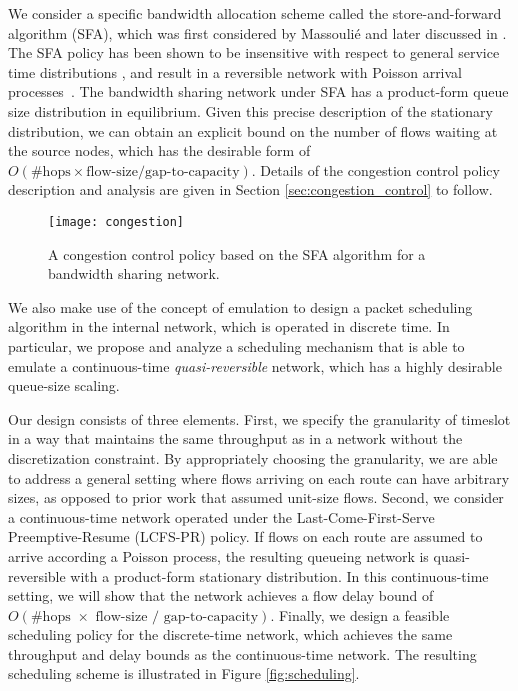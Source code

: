 \documentclass[ssy,preprint]{imsart_axv}
\numberwithin{equation}{section}
\theoremstyle{plain}
\theoremstyle{definition}
\theoremstyle{remark}
\theoremstyle{plain}
\theoremstyle{plain}
\begin{document}
We consider a specific bandwidth allocation scheme called the store-and-forward
algorithm (SFA), which was first considered by Massouli\'{e} and later
discussed in \cite{bonald2003insensitive,kelly2009resource,proutiere_thesis,walton2009fairness}.
The SFA policy has been shown to be insensitive with
respect to general service time distributions \cite{zachary2007insensitivity},
and result in a reversible network with Poisson arrival processes~\cite{walton2009fairness}. The bandwidth sharing
network under SFA has a product-form queue size distribution in equilibrium.
Given this precise description of the stationary distribution, we
can obtain an explicit bound on the number of flows waiting at the
source nodes, which has the desirable form of $\ensuremath{O}(\#\text{hops}\ensuremath{\times}\text{flow-size}\ensuremath{/}\text{gap-to-capacity})$. 
Details of the congestion control policy description and analysis
are given in Section \ref{sec:congestion_control} to follow. 

\begin{figure}
	\begin{centering}
		\texttt{[image: congestion]}
		\par\end{centering}
	\caption{A congestion control policy based on the SFA algorithm for a bandwidth
		sharing network.\label{fig:congestion_control}}
	
\end{figure}



We also make use of the concept of emulation to design a packet scheduling
algorithm in the internal network, which is operated in discrete time.
In particular, we propose and analyze a scheduling mechanism that
is able to emulate a continuous-time \emph{quasi-reversible} network,
which has a highly desirable queue-size scaling. 

Our design consists of three elements. First, we specify the granularity
of timeslot in a way that maintains the same throughput as in a network
without the discretization constraint. By appropriately choosing the granularity,
we are able to address a general setting where flows arriving on
each route can have arbitrary sizes, as opposed to prior work that assumed unit-size
flows. Second, we consider a continuous-time network
operated under the Last-Come-First-Serve Preemptive-Resume (LCFS-PR)
policy. If flows on each route are assumed to arrive according a Poisson
process, the resulting queueing network is quasi-reversible with a
product-form stationary distribution. In this continuous-time setting,
we will show that the network achieves a flow delay bound of $\ensuremath{O}(\#\text{hops }\ensuremath{\times}\text{ flow-size }\ensuremath{/}\text{ gap-to-capacity})$.
Finally, we design a feasible scheduling policy for the discrete-time
network, which achieves the same throughput and delay bounds as the
continuous-time network. The resulting scheduling scheme is illustrated
in Figure \ref{fig:scheduling}.
\end{document}
